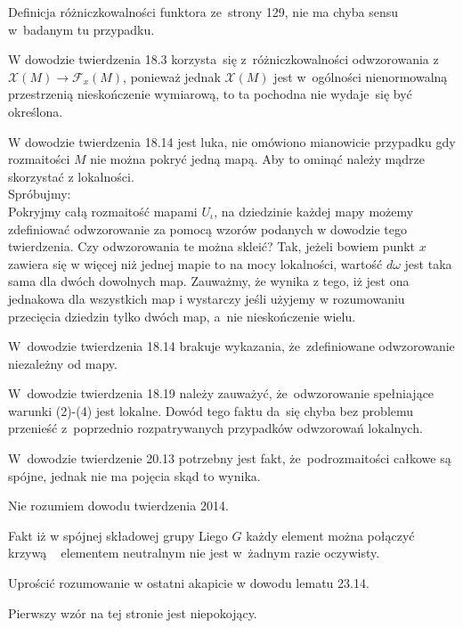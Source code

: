\documentclass[a4paper,11pt]{article}
\begin{document}
\vspace{\spaceFour}


\start {} Definicja różniczkowalności funktora ze~strony 129,
nie ma chyba sensu w~badanym tu przypadku.

\vspace{\spaceFour}


\start {} W dowodzie twierdzenia 18.3 korzysta~się
z~różniczkowalności odwzorowania
z~$\mathcal{X}( M ) \to \mathcal{F}_{ x }( M )$, ponieważ jednak
$\mathcal{X}( M )$ jest w~ogólności nienormowalną przestrzenią
nieskończenie wymiarową, to ta pochodna nie wydaje~się być określona.

\start {} W dowodzie twierdzenia 18.14 jest luka, nie omówiono mianowicie przypadku gdy rozmaitości $M$ nie można pokryć jedną mapą. Aby to ominąć należy mądrze skorzystać z lokalności. \\Spróbujmy:\\
Pokryjmy całą rozmaitość mapami $U_{ \iota }$, na dziedzinie każdej
mapy możemy zdefiniować odwzorowanie za pomocą wzorów podanych w
dowodzie tego twierdzenia. Czy odwzorowania te można skleić? Tak,
jeżeli bowiem punkt $x$ zawiera się w więcej niż jednej mapie to na
mocy lokalności, wartość $d \omega$ jest taka sama dla dwóch dowolnych
map. Zauważmy, że wynika z tego, iż jest ona jednakowa dla wszystkich
map i wystarczy jeśli użyjemy w rozumowaniu przecięcia dziedzin tylko
dwóch map, a~nie nieskończenie wielu.

\start {} W~dowodzie twierdzenia 18.14 brakuje wykazania,
że~zdefiniowane odwzorowanie niezależny od mapy.

\start {} W~dowodzie twierdzenia 18.19 należy zauważyć,
że~odwzorowanie spełniające warunki (2)-(4) jest lokalne. Dowód tego
faktu da~się chyba bez problemu przenieść z~poprzednio rozpatrywanych
przypadków odwzorowań lokalnych.

\start {} W~dowodzie twierdzenie 20.13 potrzebny jest fakt,
że~podrozmaitości całkowe są spójne, jednak nie ma pojęcia skąd to
wynika.

\start {} Nie rozumiem dowodu twierdzenia 2014.

\start {} Fakt iż w spójnej składowej grupy Liego $ G $ każdy
element można połączyć krzywą ~ elementem neutralnym nie jest w~żadnym
razie oczywisty.

\start {} Uprościć rozumowanie w ostatni akapicie w dowodu
lematu 23.14.

\start {} Pierwszy wzór na tej stronie jest niepokojący.
\end{document}
